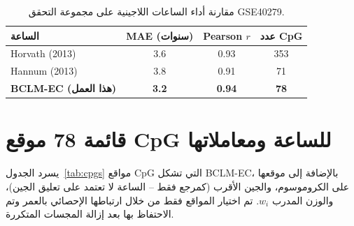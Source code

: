 \documentclass[11pt,a4paper]{article}
\begin{document}
	\begin{table}[H]
		\centering
		\caption{مقارنة أداء الساعات اللاجينية على مجموعة التحقق GSE40279.}
		\label{tab:clock-comparison}
		\begin{tabular}{lccc}
			\toprule
			\textbf{الساعة} & \textbf{MAE (سنوات)} & \textbf{Pearson \(r\)} & \textbf{عدد CpG} \\
			\midrule
			Horvath (2013) & 3.6 & 0.93 & 353 \\
			Hannum (2013)\footnotemark & 3.8 & 0.91 & 71 \\
			\textbf{BCLM-EC (هذا العمل)} & \textbf{3.2} & \textbf{0.94} & \textbf{78} \\
			\bottomrule
		\end{tabular}
	\end{table}
	
	\section{قائمة 78 موقع CpG للساعة ومعاملاتها}
	\label{sec:cpgs}
	يسرد الجدول~\ref{tab:cpgs} مواقع CpG التي تشكل BCLM-EC، بالإضافة إلى موقعها على الكروموسوم، والجين الأقرب (كمرجع فقط – الساعة لا تعتمد على تعليق الجين)، والوزن المدرب \(w_i\). تم اختيار المواقع فقط من خلال ارتباطها الإحصائي بالعمر وتم الاحتفاظ بها بعد إزالة المجسات المتكررة.
	
\end{document}
